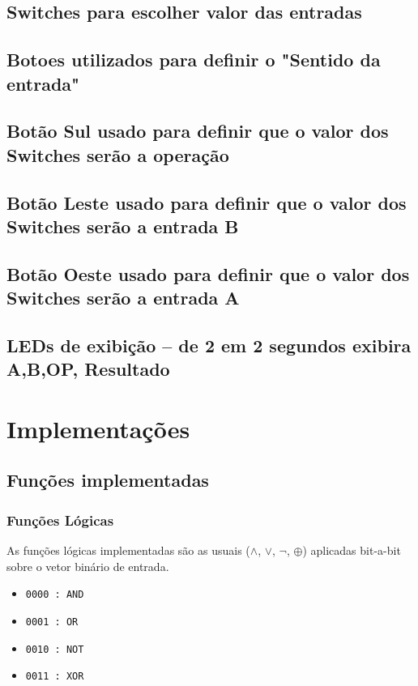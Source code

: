 \subsection{Switches para escolher valor das entradas}

\subsection{ Botoes utilizados para definir o "Sentido da entrada" }
    \subsection*{Botão Sul usado para definir que o valor dos Switches serão a operação }
    \subsection*{Botão Leste usado para definir que o valor dos Switches serão a entrada B}
    \subsection*{Botão Oeste usado para definir que o valor dos Switches serão a entrada A }

\subsection{LEDs de exibição -- de 2 em 2 segundos exibira A,B,OP, Resultado}


\section{Implementações}    
    \subsection{Funções implementadas}
    
        \subsubsection*{Funções Lógicas}
        
        As funções lógicas implementadas são as usuais ($\wedge$, $\vee$, $\neg$, $\oplus$) aplicadas bit-a-bit sobre o vetor binário de entrada.
        
        \begin{itemize}
            \item [] \hspace{10pt} \texttt{0000 : AND}
            \item [] \hspace{10pt} \texttt{0001 : OR}
            \item [] \hspace{10pt} \texttt{0010 : NOT}\footnotemark
            \item [] \hspace{10pt} \texttt{0011 : XOR}
        \end{itemize}
        

